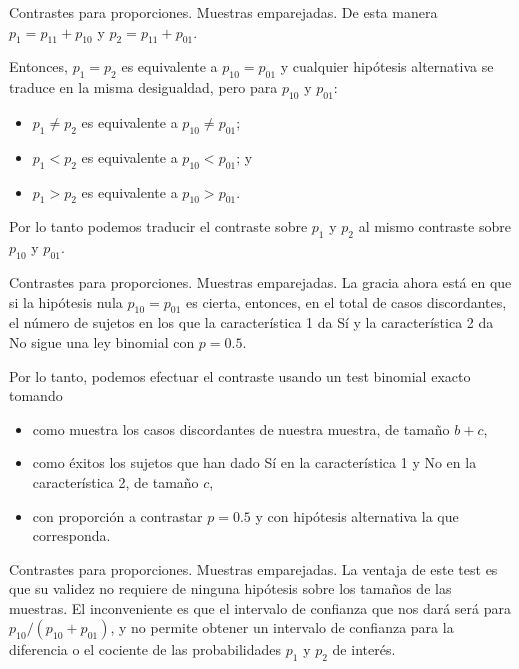 \documentclass[
  ignorenonframetext,
]{beamer}
\begin{document}
\begin{frame}{Contrastes para proporciones. Muestras emparejadas.}
\protect\hypertarget{contrastes-para-proporciones.-muestras-emparejadas.-1}{}
De esta manera \(p_1=p_{11}+p_{10}\) y \(p_2=p_{11}+p_{01}\).

Entonces, \(p_1=p_2\) es equivalente a \(p_{10}=p_{01}\) y cualquier
hipótesis alternativa se traduce en la misma desigualdad, pero para
\(p_{10}\) y \(p_{01}\):

\begin{itemize}
\item
  \(p_1\neq p_2\) es equivalente a \(p_{10}\neq p_{01}\);
\item
  \(p_1< p_2\) es equivalente a \(p_{10}< p_{01}\); y
\item
  \(p_1> p_2\) es equivalente a \(p_{10}> p_{01}\).
\end{itemize}

Por lo tanto podemos traducir el contraste sobre \(p_1\) y \(p_2\) al
mismo contraste sobre \(p_{10}\) y \(p_{01}\).
\end{frame}

\begin{frame}{Contrastes para proporciones. Muestras emparejadas.}
\protect\hypertarget{contrastes-para-proporciones.-muestras-emparejadas.-2}{}
La gracia ahora está en que si la hipótesis nula \(p_{10}=p_{01}\) es
cierta, entonces, en el total de casos discordantes, el número de
sujetos en los que la característica 1 da Sí y la característica 2 da No
sigue una ley binomial con \(p=0.5\).

Por lo tanto, podemos efectuar el contraste usando un test binomial
exacto tomando

\begin{itemize}
\item
  como muestra los casos discordantes de nuestra muestra, de tamaño
  \(b+c\),
\item
  como éxitos los sujetos que han dado Sí en la característica 1 y No en
  la característica 2, de tamaño \(c\),
\item
  con proporción a contrastar \(p=0.5\) y con hipótesis alternativa la
  que corresponda.
\end{itemize}
\end{frame}

\begin{frame}{Contrastes para proporciones. Muestras emparejadas.}
\protect\hypertarget{contrastes-para-proporciones.-muestras-emparejadas.-3}{}
La ventaja de este test es que su validez no requiere de ninguna
hipótesis sobre los tamaños de las muestras. El inconveniente es que el
intervalo de confianza que nos dará será para
\(p_{10}/(p_{10}+p_{01})\), y no permite obtener un intervalo de
confianza para la diferencia o el cociente de las probabilidades \(p_1\)
y \(p_2\) de interés.
\end{frame}
\end{document}
